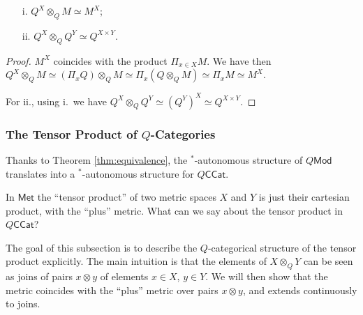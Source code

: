 \begin{proposition}\label{prop:Qtensor}
\begin{itemize}
\item[i.] $Q^{X}\otimes_{Q}M \simeq M^{X}$;
\item[ii.] $Q^{X}\otimes_{Q}Q^{Y}\simeq Q^{X\times Y}$.
\end{itemize}
\end{proposition}
\begin{proof}
$M^{X}$ coincides with the product $\Pi_{x\in X}M$. We have then 
$Q^{X}\otimes_{Q}M \simeq (\Pi_{x}Q)\otimes_{Q}M \simeq \Pi_{x}(Q\otimes_{Q}M) \simeq \Pi_{x}M\simeq M^{X}$.

For ii., using i.~we have $Q^{X}\otimes_{Q}Q^{Y}\simeq( Q^{Y})^{X}\simeq Q^{X\times Y}$.
\end{proof}


\subsubsection{The Tensor Product of $Q$-Categories}



Thanks to Theorem \ref{thm:equivalence}, the $^{*}$-autonomous structure of $Q\mathsf{Mod}$ translates into a $^{*}$-autonomous structure for $Q\mathsf{CCat}$.

In $\mathsf{Met}$ the ``tensor product'' of two metric spaces $X$ and $Y$ is just their cartesian product, with the ``plus'' metric. What can we say about the tensor product in $Q\mathsf{CCat}$?

% 
%
%
%
%
The goal of this subsection is to describe the $Q$-categorical structure of the tensor product explicitly. The main intuition is that the elements of $X\otimes_{Q}Y$ can be seen as joins of pairs $x\otimes y$ of elements $x\in X$, $y\in Y$. We will then show that the metric coincides with the ``plus'' metric over pairs $x\otimes y$, and extends continuously to joins. 


